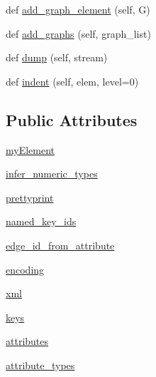 \begin{DoxyCompactItemize}
\item 
def \hyperlink{classnetworkx_1_1readwrite_1_1graphml_1_1GraphMLWriter_a94f41d8f20bd24a516cc014002c23456}{add\+\_\+graph\+\_\+element} (self, G)
\item 
def \hyperlink{classnetworkx_1_1readwrite_1_1graphml_1_1GraphMLWriter_ae16cd79d1a6859e4c216b6b465d6259b}{add\+\_\+graphs} (self, graph\+\_\+list)
\item 
def \hyperlink{classnetworkx_1_1readwrite_1_1graphml_1_1GraphMLWriter_a39d8a5d345f7abedfdb5c66baa3695f0}{dump} (self, stream)
\item 
def \hyperlink{classnetworkx_1_1readwrite_1_1graphml_1_1GraphMLWriter_a71aa068bf5ec24a8f8cb81b778529222}{indent} (self, elem, level=0)
\end{DoxyCompactItemize}
\subsection*{Public Attributes}
\begin{DoxyCompactItemize}
\item 
\hyperlink{classnetworkx_1_1readwrite_1_1graphml_1_1GraphMLWriter_a59faf2db7f0e219697a18a42d479ab4b}{my\+Element}
\item 
\hyperlink{classnetworkx_1_1readwrite_1_1graphml_1_1GraphMLWriter_a342a3cd82378829106af35e5122031ca}{infer\+\_\+numeric\+\_\+types}
\item 
\hyperlink{classnetworkx_1_1readwrite_1_1graphml_1_1GraphMLWriter_a28a5770f2132013df9628d13ea4815ce}{prettyprint}
\item 
\hyperlink{classnetworkx_1_1readwrite_1_1graphml_1_1GraphMLWriter_a89a439b25e941b82a0380ab97e185b1a}{named\+\_\+key\+\_\+ids}
\item 
\hyperlink{classnetworkx_1_1readwrite_1_1graphml_1_1GraphMLWriter_a5bee4a029dfdb4f0b66d50de8d8cf782}{edge\+\_\+id\+\_\+from\+\_\+attribute}
\item 
\hyperlink{classnetworkx_1_1readwrite_1_1graphml_1_1GraphMLWriter_a93b124d7c7e1d80add7c8e54a7f0df0a}{encoding}
\item 
\hyperlink{classnetworkx_1_1readwrite_1_1graphml_1_1GraphMLWriter_a0ba337a339a5f55fbc894ae811302af0}{xml}
\item 
\hyperlink{classnetworkx_1_1readwrite_1_1graphml_1_1GraphMLWriter_adf2b80b34f78516d059e39dc16d7bea3}{keys}
\item 
\hyperlink{classnetworkx_1_1readwrite_1_1graphml_1_1GraphMLWriter_a2d060e62229b9c4505007a2d7a57dec7}{attributes}
\item 
\hyperlink{classnetworkx_1_1readwrite_1_1graphml_1_1GraphMLWriter_a66cf3211c93141baa667ed19a770d0cf}{attribute\+\_\+types}
\end{DoxyCompactItemize}
